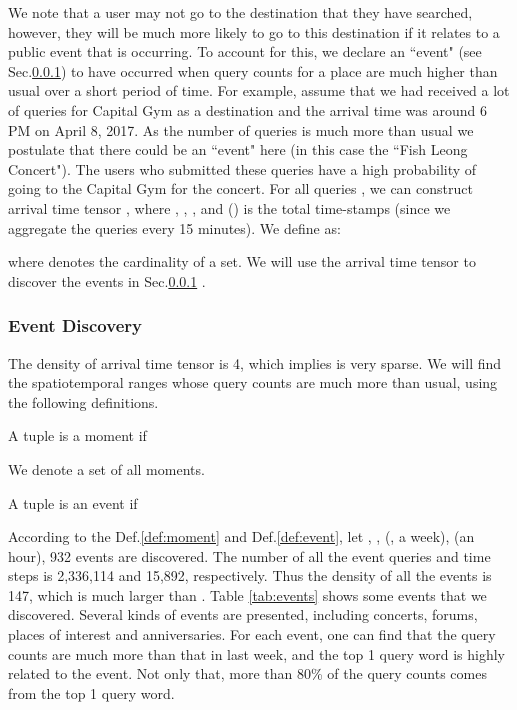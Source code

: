 We note that a user may not go to the destination that they have searched, however, they will be much more likely to go to this destination if it relates to a public event that is occurring. To account for this, we declare an ``event" (see Sec.\ref{eventdiscovery}) to have occurred when query counts for a place are much higher than usual over a short period of time. For example, assume that we had received a lot of queries for Capital Gym as a destination and the arrival time was around 6 PM on April 8, 2017. As the number of queries is much more than usual we postulate that there could be an ``event" here (in this case the ``Fish Leong Concert"). The users who submitted these queries have a high probability of going to the Capital Gym for the concert. For all queries , we can construct arrival time tensor , where , , , and  () is the total time-stamps (since we aggregate the queries every 15 minutes). We define  as:

\noindent where  denotes the cardinality of a set. We will use the arrival time tensor  to discover the events in Sec.\ref{eventdiscovery} .


\subsubsection{Event Discovery}
\label{eventdiscovery}
The density  of arrival time tensor  is 4, which implies  is very sparse. We will find the spatiotemporal ranges whose query counts are much more than usual, using the following definitions.

\begin{definition}[Moment]
    \label{def:moment}
    A tuple  is a moment if 
        
\end{definition}
We denote  a set of all moments.

\begin{definition}[Event]
    \label{def:event}
    A tuple  is an event if 
    
\end{definition}

According to the Def.\ref{def:moment} and Def.\ref{def:event}, let , ,   (, a week),  (an hour), 932 events are discovered. The number of all the event queries and time steps is 2,336,114 and 15,892, respectively. Thus the density  of all the events is 147, which is much larger than . Table \ref{tab:events} shows some events that we discovered. Several kinds of events are presented, including concerts, forums, places of interest and anniversaries. For each event, one can find that the query counts are much more than that in last week, and the top 1 query word is highly related to the event. Not only that, more than 80\% of the query counts comes from the top 1 query word.



